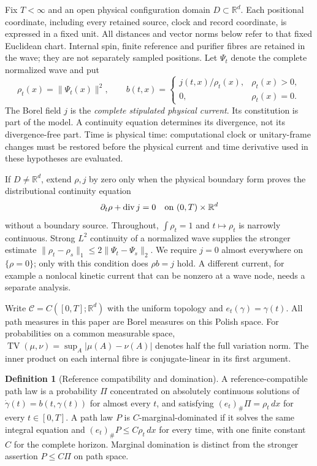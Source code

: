 \documentclass[11pt]{article}
\numberwithin{equation}{section}
\theoremstyle{definition}
\newtheorem{definition}[theorem]{Definition}
\theoremstyle{remark}
\newcommand{\TV}{\operatorname{TV}}
\begin{document}
Fix $T<\infty$ and an open physical configuration domain
$D\subset\mathbb R^d$. Each positional coordinate, including every retained
source, clock and record coordinate, is expressed in a fixed unit. All
distances and vector norms below refer to that fixed Euclidean chart.
Internal spin, finite reference and purifier fibres are retained in the
wave; they are not separately sampled positions. Let $\Psi_t$ denote the
complete normalized wave and put
\[
 \rho_t(x)=\|\Psi_t(x)\|^2,\qquad
 b(t,x)=
 \begin{cases}j(t,x)/\rho_t(x),&\rho_t(x)>0,\\
 0,&\rho_t(x)=0.\end{cases}
\]
The Borel field $j$ is the \emph{complete stipulated physical current}.
Its constitution is part of the model. A continuity equation determines
its divergence, not its divergence-free part.
Time is physical time: computational clock or unitary-frame changes
must be restored before the physical current and time derivative used
in these hypotheses are evaluated.

If $D\ne\mathbb R^d$, extend $\rho,j$ by zero only when the physical
boundary form proves the distributional continuity equation
\begin{equation}\label{p3f:eq:CE}
 \partial_t\rho+\operatorname{div}j=0
 \quad\hbox{on }(0,T)\times\mathbb R^d
\end{equation}
without a boundary source. Throughout, $\int\rho_t=1$ and
$t\mapsto\rho_t$ is narrowly continuous. Strong $L^2$ continuity of a
normalized wave supplies the stronger estimate
$\|\rho_t-\rho_s\|_1\leq2\|\Psi_t-\Psi_s\|_2$.
We require $j=0$ almost everywhere on $\{\rho=0\}$; only with this
condition does $\rho b=j$ hold. A different current, for example a
nonlocal kinetic current that can be nonzero at a wave node, needs a
separate analysis.

Write $\mathcal C=C([0,T];\mathbb R^d)$ with the uniform topology and
$e_t(\gamma)=\gamma(t)$. All path measures in this paper are Borel measures
on this Polish space. For probabilities on a common measurable space,
$\TV(\mu,\nu)=\sup_A|\mu(A)-\nu(A)|$ denotes half the full variation
norm. The inner product on each internal fibre is conjugate-linear in
its first argument.

\begin{definition}[Reference compatibility and domination]
\label{p3f:def:pathlaws}
A reference-compatible path law is a probability $\Pi$ concentrated on
absolutely continuous solutions of
$\dot\gamma(t)=b(t,\gamma(t))$ for almost every $t$, and satisfying
$(e_t)_\#\Pi=\rho_t\,dx$ for every $t\in[0,T]$.
A path law $P$ is $C$-marginal-dominated if it solves the same integral
equation and $(e_t)_\#P\leq C\rho_t\,dx$ for every time, with one finite
constant $C$ for the complete horizon. Marginal domination is distinct
from the stronger assertion $P\leq C\Pi$ on path space.
\end{definition}
\end{document}
